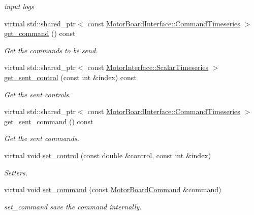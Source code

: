 \begin{DoxyCompactItemize}
\begin{DoxyCompactList}\small\item\em input logs \end{DoxyCompactList}\item 
virtual std\+::shared\+\_\+ptr$<$ const \hyperlink{classblmc__drivers_1_1MotorBoardInterface_ae2afe94a023d9f08a4c689e9b7660f15}{Motor\+Board\+Interface\+::\+Command\+Timeseries} $>$ \hyperlink{classblmc__drivers_1_1SpiMotorBoard_a3a3b3b043762c2a232d7e724aea8a6ff}{get\+\_\+command} () const 
\begin{DoxyCompactList}\small\item\em Get the commands to be send. \end{DoxyCompactList}\item 
virtual std\+::shared\+\_\+ptr$<$ const \hyperlink{classblmc__drivers_1_1MotorInterface_a49b8fc916b9f9debbd7b0988463db5cd}{Motor\+Interface\+::\+Scalar\+Timeseries} $>$ \hyperlink{classblmc__drivers_1_1SpiMotorBoard_a26b6e07529dfdbae891a61d6823e3bdb}{get\+\_\+sent\+\_\+control} (const int \&index) const 
\begin{DoxyCompactList}\small\item\em Get the sent controls. \end{DoxyCompactList}\item 
virtual std\+::shared\+\_\+ptr$<$ const \hyperlink{classblmc__drivers_1_1MotorBoardInterface_ae2afe94a023d9f08a4c689e9b7660f15}{Motor\+Board\+Interface\+::\+Command\+Timeseries} $>$ \hyperlink{classblmc__drivers_1_1SpiMotorBoard_a187c15b804f4e7b49f2cd21625ae2512}{get\+\_\+sent\+\_\+command} () const 
\begin{DoxyCompactList}\small\item\em Get the sent commands. \end{DoxyCompactList}\item 
virtual void \hyperlink{classblmc__drivers_1_1SpiMotorBoard_ae11c5382665adfa718bcc43ec1e84b6e}{set\+\_\+control} (const double \&control, const int \&index)
\begin{DoxyCompactList}\small\item\em Setters. \end{DoxyCompactList}\item 
virtual void \hyperlink{classblmc__drivers_1_1SpiMotorBoard_a6b626225af993444bdee397952281772}{set\+\_\+command} (const \hyperlink{classblmc__drivers_1_1MotorBoardCommand}{Motor\+Board\+Command} \&command)
\begin{DoxyCompactList}\small\item\em set\+\_\+command save the command internally. \end{DoxyCompactList}\item 

\end{DoxyCompactItemize}
